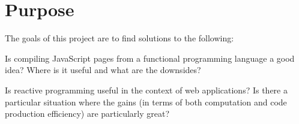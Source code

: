 \section{Purpose}

The goals of this project are to find solutions to the following:

Is compiling JavaScript pages from a functional programming language a good idea? Where is it useful and what are the downsides?

Is reactive programming useful in the context of web applications? Is there a particular situation where the gains (in terms of both computation and code production efficiency) are particularly great?
